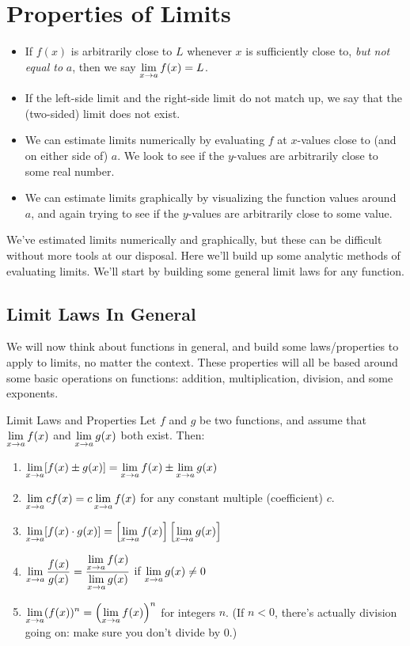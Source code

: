 \section{Properties of Limits}

\begin{recap}
  \begin{itemize}
    \item If $f(x)$ is arbitrarily close to $L$ whenever $x$ is sufficiently close to, \textit{but not equal to} $a$, then we say $\displaystyle \lim_{x\to a}f(x) = L$.
    \item If the left-side limit and the right-side limit do not match up, we say that the (two-sided) limit does not exist.
    \item We can estimate limits numerically by evaluating $f$ at $x$-values close to (and on either side of) $a$.
    We look to see if the $y$-values are arbitrarily close to some real number.
    \item We can estimate limits graphically by visualizing the function values around $a$, and again trying to see if the $y$-values are arbitrarily close to some value.
  \end{itemize}
\end{recap}

We've estimated limits numerically and graphically, but these can be difficult without more tools at our disposal.
Here we'll build up some analytic methods of evaluating limits.
We'll start by building some general limit laws for any function.

\subsection*{Limit Laws In General}

We will now think about functions in general, and build some laws/properties to apply to limits, no matter the context.
These properties will all be based around some basic operations on functions: addition, multiplication, division, and some exponents.

\begin{imp}{Limit Laws and Properties}
  Let $f$ and $g$ be two functions, and assume that $\displaystyle \lim_{x\to a} f(x)$ and $\displaystyle \lim_{x\to a} g(x)$ both exist.
  Then:
  \begin{enumerate}
    \item $\displaystyle \lim_{x\to a} [f(x)\pm g(x)] = \lim_{x\to a} f(x) \pm \lim_{x\to a} g(x)$
    \item $\displaystyle \lim_{x\to a} cf(x) = c\lim_{x\to a} f(x)$ for any constant multiple (coefficient) $c$.
    \item $\displaystyle \lim_{x\to a} [f(x)\cdot g(x)] = \left[\lim_{x\to a} f(x)\right] \left[\lim_{x\to a} g(x)\right]$
    \item $\displaystyle \lim_{x\to a} \frac{f(x)}{g(x)} = \frac{\displaystyle \lim_{x\to a} f(x)}{\displaystyle \lim_{x\to a} g(x)}$ if $\displaystyle \lim_{x\to a} g(x)\neq0$
    \item $\displaystyle \lim_{x\to a} (f(x))^n = \left(\displaystyle \lim_{x\to a} f(x) \right)^n$ for integers $n$. (If $n<0$, there's actually division going on: make sure you don't divide by 0.)
  \end{enumerate}
\end{imp}

